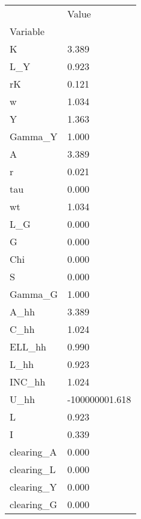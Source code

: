 \begin{tabular}{ll}
\toprule
{} &           Value \\
Variable   &                 \\
\midrule
K          &           3.389 \\
L\_Y        &           0.923 \\
rK         &           0.121 \\
w          &           1.034 \\
Y          &           1.363 \\
Gamma\_Y    &           1.000 \\
A          &           3.389 \\
r          &           0.021 \\
tau        &           0.000 \\
wt         &           1.034 \\
L\_G        &           0.000 \\
G          &           0.000 \\
Chi        &           0.000 \\
S          &           0.000 \\
Gamma\_G    &           1.000 \\
A\_hh       &           3.389 \\
C\_hh       &           1.024 \\
ELL\_hh     &           0.990 \\
L\_hh       &           0.923 \\
INC\_hh     &           1.024 \\
U\_hh       &  -100000001.618 \\
L          &           0.923 \\
I          &           0.339 \\
clearing\_A &           0.000 \\
clearing\_L &           0.000 \\
clearing\_Y &           0.000 \\
clearing\_G &           0.000 \\
\bottomrule
\end{tabular}

